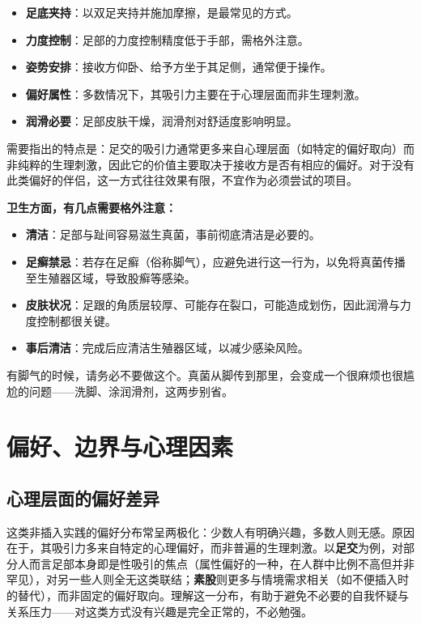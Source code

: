 \documentclass[12pt,UTF8]{ctexbook}
\begin{document}
\begin{itemize}
\item \textbf{足底夹持}：以双足夹持并施加摩擦，是最常见的方式。
\item \textbf{力度控制}：足部的力度控制精度低于手部，需格外注意。
\item \textbf{姿势安排}：接收方仰卧、给予方坐于其足侧，通常便于操作。
\item \textbf{偏好属性}：多数情况下，其吸引力主要在于心理层面而非生理刺激。
\item \textbf{润滑必要}：足部皮肤干燥，润滑剂对舒适度影响明显。
\end{itemize}

需要指出的特点是：足交的吸引力通常更多来自心理层面（如特定的偏好取向）而非纯粹的生理刺激，因此它的价值主要取决于接收方是否有相应的偏好。对于没有此类偏好的伴侣，这一方式往往效果有限，不宜作为必须尝试的项目。

\textbf{卫生方面，有几点需要格外注意：}

\begin{itemize}
\item \textbf{清洁}：足部与趾间容易滋生真菌，事前彻底清洁是必要的。
\item \textbf{足癣禁忌}：若存在足癣（俗称脚气），应避免进行这一行为，以免将真菌传播至生殖器区域，导致股癣等感染。
\item \textbf{皮肤状况}：足跟的角质层较厚、可能存在裂口，可能造成划伤，因此润滑与力度控制都很关键。
\item \textbf{事后清洁}：完成后应清洁生殖器区域，以减少感染风险。
\end{itemize}

\begin{tcolorbox}[colback=pink!5!white,colframe=red!50!black,title=贴心小叮咛]
有脚气的时候，请务必不要做这个。真菌从脚传到那里，会变成一个很麻烦也很尴尬的问题——洗脚、涂润滑剂，这两步别省。
\end{tcolorbox}

\section{偏好、边界与心理因素}

\subsection{心理层面的偏好差异}

这类非插入实践的偏好分布常呈两极化：少数人有明确兴趣，多数人则无感。原因在于，其吸引力多来自特定的心理偏好，而非普遍的生理刺激。以\textbf{足交}为例，对部分人而言足部本身即是性吸引的焦点（属性偏好的一种，在人群中比例不高但并非罕见），对另一些人则全无这类联结；\textbf{素股}则更多与情境需求相关（如不便插入时的替代），而非固定的偏好取向。理解这一分布，有助于避免不必要的自我怀疑与关系压力——对这类方式没有兴趣是完全正常的，不必勉强。
\end{document}
